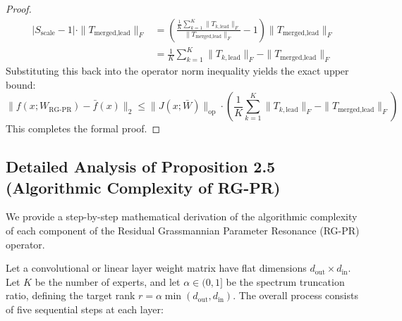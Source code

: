 \documentclass{article}
\theoremstyle{plain}
\theoremstyle{definition}
\theoremstyle{remark}
\begin{document}
\begin{proof}
\begin{align}
    | S_{\text{scale}} - 1 | \cdot \| T_{\text{merged}, \text{lead}} \|_F &= \left( \frac{\frac{1}{K} \sum_{k=1}^K \| T_{k, \text{lead}} \|_F}{\| T_{\text{merged}, \text{lead}} \|_F} - 1 \right) \| T_{\text{merged}, \text{lead}} \|_F \\
    &= \frac{1}{K} \sum_{k=1}^K \| T_{k, \text{lead}} \|_F - \| T_{\text{merged}, \text{lead}} \|_F
\end{align}
Substituting this back into the operator norm inequality yields the exact upper bound:
\begin{equation}
    \| f(x; W_{\text{RG-PR}}) - \bar{f}(x) \|_2 \le \| J(x; \bar{W}) \|_{\text{op}} \cdot \left( \frac{1}{K} \sum_{k=1}^K \| T_{k, \text{lead}} \|_F - \| T_{\text{merged}, \text{lead}} \|_F \right)
\end{equation}
This completes the formal proof.
\end{proof}

\subsection{Detailed Analysis of Proposition 2.5 (Algorithmic Complexity of RG-PR)}
\label{app:complexity_derivation}

We provide a step-by-step mathematical derivation of the algorithmic complexity of each component of the Residual Grassmannian Parameter Resonance (RG-PR) operator.

Let a convolutional or linear layer weight matrix have flat dimensions $d_{\text{out}} \times d_{\text{in}}$. Let $K$ be the number of experts, and let $\alpha \in (0, 1]$ be the spectrum truncation ratio, defining the target rank $r = \alpha \min(d_{\text{out}}, d_{\text{in}})$. The overall process consists of five sequential steps at each layer:
\end{document}
